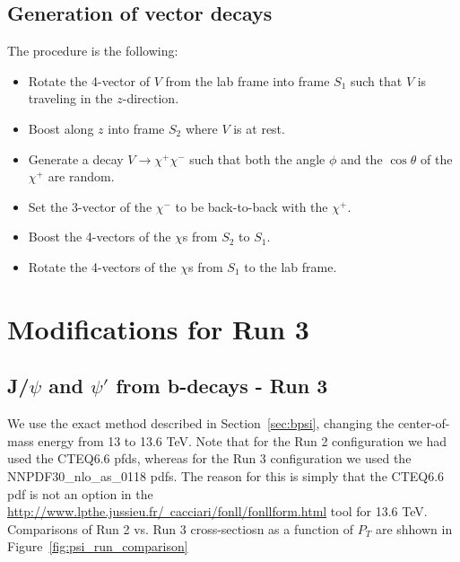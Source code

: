 \documentclass[12pt]{article}
\begin{document}
\subsection{Generation of vector decays}

The procedure is the following:

\begin{itemize}
  \item Rotate the 4-vector of $V$ from the lab frame into frame
    $S_1$ such that $V$ is traveling in the $z$-direction.
  \item  Boost along $z$ into frame $S_2$ where $V$ is at rest.
  \item Generate a decay $V \to \chi^+ \chi^-$ such that
    both the angle $\phi$ and the $\cos \theta$ of the $\chi^+$ are random.
  \item   Set the 3-vector of the $\chi^-$ to be back-to-back with the $\chi^+$.
  \item Boost the 4-vectors of the $\chi$s from $S_2$ to $S_1$.
\item Rotate the 4-vectors of the $\chi$s from $S_1$ to the lab frame.
\end{itemize}

\clearpage

\appendix



\section{Modifications for Run 3}

\subsection{J/$\psi$ and $\psi'$ from b-decays - Run 3}
\label{sec:bpsi3}
We use the exact method described in Section~\ref{sec:bpsi}, changing the center-of-mass energy
from 13 to 13.6 TeV.  Note that for the Run 2 configuration we had used the CTEQ6.6 pfds,
whereas for the Run 3 configuration we used the NNPDF30\_nlo\_as\_0118 pdfs.  The reason
for this is simply that the CTEQ6.6 pdf is not an option in the \\
\href{http://www.lpthe.jussieu.fr/~cacciari/fonll/fonllform.html}
     {http://www.lpthe.jussieu.fr/~cacciari/fonll/fonllform.html} 
     tool for 13.6 TeV.  Comparisons of Run 2 vs. Run 3 cross-sectiosn as a function
     of $P_T$ are shhown in Figure~\ref{fig:psi_run_comparison} 
\end{document}
